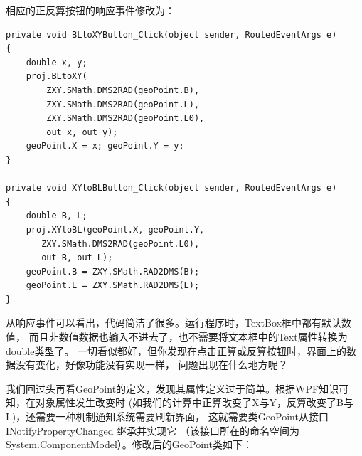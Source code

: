 相应的正反算按钮的响应事件修改为：

\begin{lstlisting}
private void BLtoXYButton_Click(object sender, RoutedEventArgs e)
{
    double x, y;
    proj.BLtoXY(
        ZXY.SMath.DMS2RAD(geoPoint.B),
        ZXY.SMath.DMS2RAD(geoPoint.L),
        ZXY.SMath.DMS2RAD(geoPoint.L0),
        out x, out y);
    geoPoint.X = x; geoPoint.Y = y;
}

private void XYtoBLButton_Click(object sender, RoutedEventArgs e)
{
    double B, L;
    proj.XYtoBL(geoPoint.X, geoPoint.Y,
       ZXY.SMath.DMS2RAD(geoPoint.L0),
       out B, out L);
    geoPoint.B = ZXY.SMath.RAD2DMS(B);
    geoPoint.L = ZXY.SMath.RAD2DMS(L);
}
\end{lstlisting}

从响应事件可以看出，代码简洁了很多。运行程序时，TextBox框中都有默认数值，
而且非数值数据也输入不进去了，也不需要将文本框中的Text属性转换为double类型了。
一切看似都好，但你发现在点击正算或反算按钮时，界面上的数据没有变化，好像功能没有实现一样，
问题出现在什么地方呢？

我们回过头再看GeoPoint的定义，发现其属性定义过于简单。根据WPF知识可知，在对象属性发生改变时
(如我们的计算中正算改变了X与Y，反算改变了B与L)，还需要一种机制通知系统需要刷新界面，
这就需要类GeoPoint从接口 INotifyPropertyChanged 继承并实现它
（该接口所在的命名空间为System.ComponentModel）。修改后的GeoPoint类如下：

